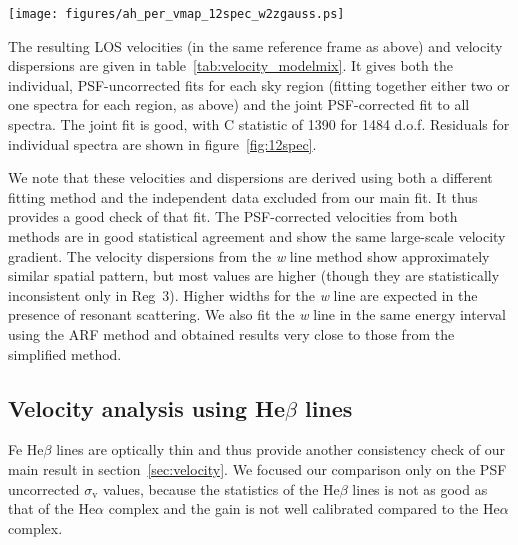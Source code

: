 \begin{figure*}
 \begin{center}
  \texttt{[image: figures/ah\_per\_vmap\_12spec\_w2zgauss.ps]}
 \end{center}
 \vspace{30mm}
 \caption{Fits and residuals for the joint fit of all spectra using the {\it w}-line method (figure~\ref{fig:2gausreg43}). The continuum energy interval to the left of the line complex (see figure~\ref{fig:2gausreg43}) is not not shown.}
 \label{fig:12spec}
\end{figure*}

The resulting LOS velocities (in the same reference frame as above) and velocity dispersions are given in table~\ref{tab:velocity_modelmix}. It gives both the individual, PSF-uncorrected fits for each sky region (fitting together either two or one spectra for each region, as above) and the joint PSF-corrected fit to all spectra. The joint fit is good, with C statistic of 1390 for 1484 d.o.f. Residuals for individual spectra are shown in figure~\ref{fig:12spec}.

We note that these velocities and dispersions are derived using both a different fitting method and the independent data excluded from our main fit. It thus provides a good check of that fit. The PSF-corrected velocities from both methods are in good statistical agreement and show the same large-scale velocity gradient. The velocity dispersions from the {\it w} line method show approximately similar spatial pattern, but most values are higher (though they are statistically inconsistent only in Reg~3). Higher widths for the {\it w} line are expected in the presence of resonant scattering. We also fit the {\it w} line in the same energy interval using the ARF method and obtained results very close to those from the simplified method.


\subsection{Velocity analysis using He$\beta$ lines}
\label{sec:heb}

Fe He$\beta$ lines are optically thin and thus provide another consistency check of our main result in section~\ref{sec:velocity}. We focused our comparison only on the PSF uncorrected $\sigma_\mathrm{v}$ values, because the statistics of the He$\beta$ lines is not as good as that of the He$\alpha$ complex and the gain is not well calibrated compared to the He$\alpha$ complex.

